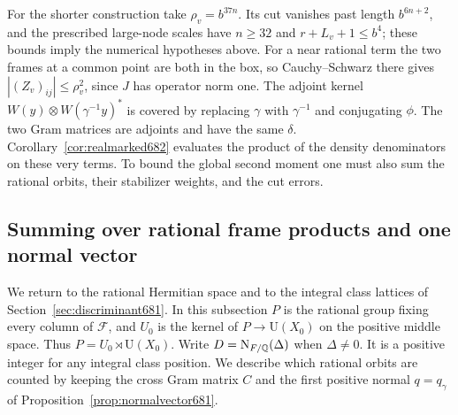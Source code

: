 \documentclass[a4paper,11pt]{article}
\theoremstyle{definition}
\theoremstyle{remark}
\numberwithin{equation}{section}
\begin{document}
For the shorter construction take \(\rho_v=b^{37n}\). Its
cut vanishes past length \(b^{6n+2}\), and the prescribed
large-node scales have \(n\ge32\) and \(r+L_v+1\le b^4\);
these bounds imply the numerical hypotheses above. For a
near rational term the two frames at a common point are both
in the box, so Cauchy--Schwarz there gives
\(|(Z_v)_{ij}|\le\rho_v^2\), since \(J\) has operator norm one.
The adjoint kernel \(W(y)\otimes W(\gamma^{-1}y)^*\) is covered
by replacing \(\gamma\) with \(\gamma^{-1}\) and conjugating
\(\phi\). The two Gram matrices are adjoints and have the same
\(\delta\). Corollary~\ref{cor:realmarked682} evaluates the
product of the density denominators on these very terms. To
bound the global second moment one must also sum the rational
orbits, their stabilizer weights, and the cut errors.


\subsection{Summing over rational frame products and one normal vector}
\label{sec:firstnormal686}

We return to the rational Hermitian space and to the integral
class lattices of Section~\ref{sec:discriminant681}. In this
subsection \(P\) is the rational group fixing every column of
\(\mathcal F\), and \(U_0\) is the kernel of \(P\to\mathrm U(X_0)\)
on the positive middle space. Thus \(P=U_0\rtimes\mathrm U(X_0)\).
Write \(D={\rm N}_{F/\mathbb Q}(\Delta)\) when \(\Delta\ne0\).
It is a positive integer for any integral class position. We
describe which rational orbits are counted by keeping the cross
Gram matrix \(C\) and the first positive normal \(q=q_\gamma\)
of Proposition~\ref{prop:normalvector681}.
\end{document}
